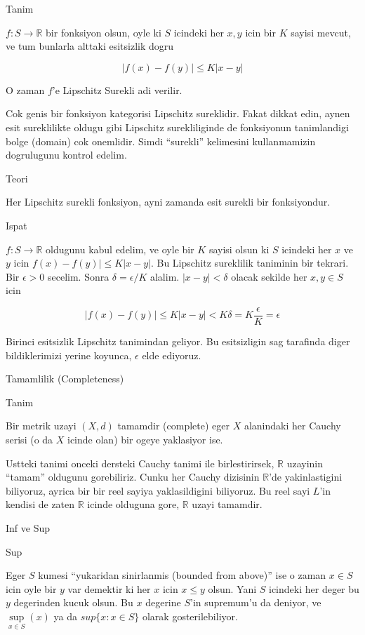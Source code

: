 \documentclass[12pt,fleqn]{article}\usepackage{../common}
\begin{document}
Tanim 

$f:S \to \mathbb{R}$ bir fonksiyon olsun, oyle ki $S$ icindeki her $x,y$
icin bir $K$ sayisi mevcut, ve tum bunlarla alttaki esitsizlik 
dogru

\[ |f(x) - f(y)| \le K|x-y| \]

O zaman $f$'e Lipschitz Surekli adi verilir. 

Cok genis bir fonksiyon kategorisi Lipschitz sureklidir. Fakat dikkat edin,
aynen esit sureklilikte oldugu gibi Lipschitz surekliliginde de fonksiyonun
tanimlandigi bolge (domain) cok onemlidir. Simdi ``surekli'' kelimesini
kullanmamizin dogrulugunu kontrol edelim. 

Teori 

Her Lipschitz surekli fonksiyon, ayni zamanda esit surekli bir
fonksiyondur. 

Ispat

$f: S \to \mathbb{R}$ oldugunu kabul edelim, ve oyle bir $K$ sayisi olsun ki $S$
icindeki her $x$ ve $y$ icin $f(x) - f(y)| \le K|x-y|$. Bu Lipschitz sureklilik
taniminin bir tekrari. Bir $\epsilon > 0$ secelim. Sonra $\delta =
\epsilon / K$ alalim. 
$|x-y| < \delta$ olacak sekilde her $x,y \in S$ icin 

\[ |f(x) - f(y)| \le K|x-y| < K\delta = K \frac{ \epsilon}{K} = \epsilon \]

Birinci esitsizlik Lipschitz tanimindan geliyor. Bu esitsizligin sag
tarafinda diger bildiklerimizi yerine koyunca, $\epsilon$ elde ediyoruz. 

Tamamlilik (Completeness) 

Tanim

Bir metrik uzayi $(X,d)$ tamamdir (complete) eger $X$ alanindaki her Cauchy
serisi (o da $X$ icinde olan) bir ogeye yaklasiyor ise. 

Ustteki tanimi onceki dersteki Cauchy tanimi ile birlestirirsek,
$\mathbb{R}$ uzayinin ``tamam'' oldugunu gorebiliriz. Cunku her Cauchy
dizisinin $\mathbb{R}$'de yakinlastigini biliyoruz, ayrica bir bir reel sayiya
yaklasildigini biliyoruz. Bu reel sayi $L$'in kendisi de zaten $\mathbb{R}$ icinde
olduguna gore, $\mathbb{R}$ uzayi tamamdir. 

Inf ve Sup

Sup

Eger $S$ kumesi ``yukaridan sinirlanmis (bounded from above)'' ise o zaman
$x \in S$ icin oyle bir $y$ var demektir ki her $x$ icin $x \le y$
olsun. Yani $S$ icindeki her deger bu $y$ degerinden kucuk olsun. Bu $x$
degerine $S$'in supremum'u da deniyor, ve $\sup\limits_{x \in S}(x)$ ya da
$sup\{x:x \in S\}$ olarak gosterilebiliyor. 
\end{document}
